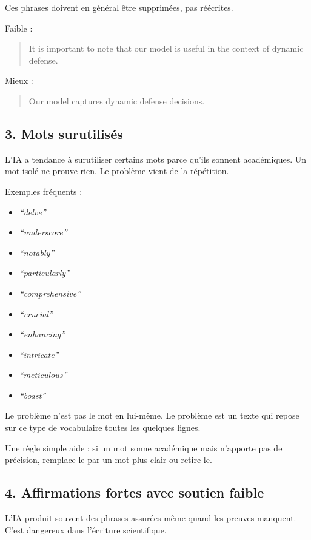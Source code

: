 \documentclass[11pt,a4paper]{article}
\theoremstyle{definition}
\begin{document}
Ces phrases doivent en général être supprimées, pas réécrites.

Faible :
\begin{quote}
It is important to note that our model is useful in the context of dynamic defense.
\end{quote}

Mieux :
\begin{quote}
Our model captures dynamic defense decisions.
\end{quote}

\subsection*{3. Mots surutilisés}

L'IA a tendance à surutiliser certains mots parce qu'ils sonnent académiques.
Un mot isolé ne prouve rien. Le problème vient de la répétition.

Exemples fréquents :
\begin{itemize}
    \item \textit{``delve''}
    \item \textit{``underscore''}
    \item \textit{``notably''}
    \item \textit{``particularly''}
    \item \textit{``comprehensive''}
    \item \textit{``crucial''}
    \item \textit{``enhancing''}
    \item \textit{``intricate''}
    \item \textit{``meticulous''}
    \item \textit{``boast''}
\end{itemize}

Le problème n'est pas le mot en lui-même. Le problème est un texte qui repose sur ce type de vocabulaire toutes les quelques lignes.

Une règle simple aide : si un mot sonne académique mais n'apporte pas de précision, remplace-le par un mot plus clair ou retire-le.

\subsection*{4. Affirmations fortes avec soutien faible}

L'IA produit souvent des phrases assurées même quand les preuves manquent.
C'est dangereux dans l'écriture scientifique.
\end{document}

